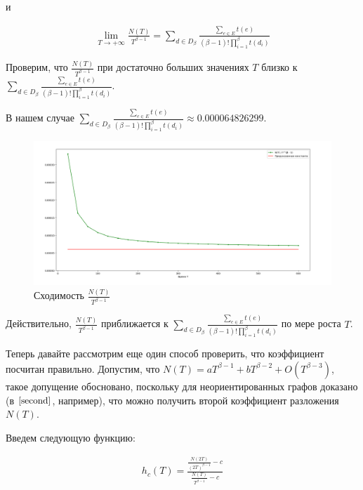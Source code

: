 \documentclass{article}
\begin{document}
и

\begin{align*}
    \lim_{T \to +\infty}{\frac{N(T)}{T^{\beta - 1}}} = \sum_{d \in D_{\beta}}\frac{\sum_{e \in E}{t(e)}}{(\beta - 1)!\prod_{i = 1}^{\beta}{t(d_{i})}}
\end{align*}


Проверим, что $\frac{N(T)}{T^{\beta - 1}}$ при достаточно больших значениях $T$ близко к $\sum_{d \in D_{\beta}}\frac{\sum_{e \in E}{t(e)}}{(\beta - 1)!\prod_{i = 1}^{\beta}{t(d_{i})}}$.

В нашем случае $\sum_{d \in D_{\beta}}\frac{\sum_{e \in E}{t(e)}}{(\beta - 1)!\prod_{i = 1}^{\beta}{t(d_{i})}} \approx 0.000064826299$.
\begin{figure}[!htb]
\begin{center}
\includegraphics[scale=0.5]{Experiment.png}
\end{center}
\caption{Сходимость $\frac{N(T)}{T^{\beta - 1}}$}
\end{figure}

\FloatBarrier

Действительно, $\frac{N(T)}{T^{\beta - 1}}$ приближается к $\sum_{d \in D_{\beta}}\frac{\sum_{e \in E}{t(e)}}{(\beta - 1)!\prod_{i = 1}^{\beta}{t(d_{i})}}$ по мере роста $T$.

Теперь давайте рассмотрим еще один способ проверить, что коэффициент посчитан правильно.
Допустим, что $N(T) = aT^{\beta - 1} + bT^{\beta - 2} + O(T^{\beta - 3})$, такое допущение обосновано, поскольку для неориентированных графов доказано (в $\cite{second}$, например), что можно получить второй коэффициент разложения $N(T)$.

Введем следующую функцию:

\begin{gather*}
    h_{c}(T) = \frac{\frac{N(2T)}{(2T)^{\beta - 1}} - c}{\frac{N(T)}{T^{\beta - 1}} - c} \\
\end{gather*}
\end{document}

